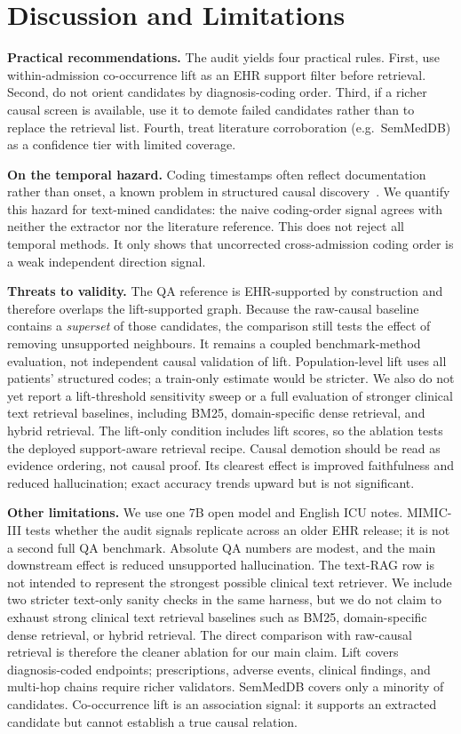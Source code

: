 \documentclass[runningheads]{llncs}
\begin{document}
\section{Discussion and Limitations}
\noindent\textbf{Practical recommendations.} The audit yields four practical rules. First, use within-admission co-occurrence lift as an EHR support filter before retrieval. Second, do not orient candidates by diagnosis-coding order. Third, if a richer causal screen is available, use it to demote failed candidates rather than to replace the retrieval list. Fourth, treat literature corroboration (e.g.\ SemMedDB) as a confidence tier with limited coverage.

\noindent\textbf{On the temporal hazard.} Coding timestamps often reflect documentation rather than onset, a known problem in structured causal discovery~\cite{shen2021causaldiscovery}. We quantify this hazard for text-mined candidates: the naive coding-order signal agrees with neither the extractor nor the literature reference. This does not reject all temporal methods. It only shows that uncorrected cross-admission coding order is a weak independent direction signal.

\noindent\textbf{Threats to validity.} The QA reference is EHR-supported by construction and therefore overlaps the lift-supported graph. Because the raw-causal baseline contains a \emph{superset} of those candidates, the comparison still tests the effect of removing unsupported neighbours. It remains a coupled benchmark-method evaluation, not independent causal validation of lift. Population-level lift uses all patients' structured codes; a train-only estimate would be stricter. We also do not yet report a lift-threshold sensitivity sweep or a full evaluation of stronger clinical text retrieval baselines, including BM25, domain-specific dense retrieval, and hybrid retrieval. The lift-only condition includes lift scores, so the ablation tests the deployed support-aware retrieval recipe. Causal demotion should be read as evidence ordering, not causal proof. Its clearest effect is improved faithfulness and reduced hallucination; exact accuracy trends upward but is not significant.

\noindent\textbf{Other limitations.} We use one 7B open model and English ICU notes. MIMIC-III tests whether the audit signals replicate across an older EHR release; it is not a second full QA benchmark. Absolute QA numbers are modest, and the main downstream effect is reduced unsupported hallucination. The text-RAG row is not intended to represent the strongest possible clinical text retriever. We include two stricter text-only sanity checks in the same harness, but we do not claim to exhaust strong clinical text retrieval baselines such as BM25, domain-specific dense retrieval, or hybrid retrieval. The direct comparison with raw-causal retrieval is therefore the cleaner ablation for our main claim. Lift covers diagnosis-coded endpoints; prescriptions, adverse events, clinical findings, and multi-hop chains require richer validators. SemMedDB covers only a minority of candidates. Co-occurrence lift is an association signal: it supports an extracted candidate but cannot establish a true causal relation.
\end{document}
